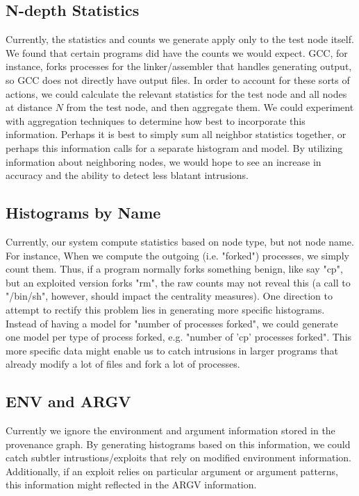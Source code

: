 \documentclass[10pt,twocolumn]{article}
\begin{document}
\subsection{N-depth Statistics}
Currently, the statistics and counts we generate apply only to the test node itself. We found that certain programs did have the counts we would expect. GCC, for instance, forks processes for the linker/assembler that handles generating output, so GCC does not directly have output files. In order to account for these sorts of actions, we could calculate the relevant statistics for the test node and all nodes at distance $N$ from the test node, and then aggregate them. We could experiment with aggregation techniques to determine how best to incorporate this information. Perhaps it is best to simply sum all neighbor statistics together, or perhaps this information calls for a separate histogram and model. By utilizing information about neighboring nodes, we would hope to see an increase in accuracy and the ability to detect less blatant intrusions.
\subsection{Histograms by Name}
Currently, our system compute statistics based on node type, but not node name. For instance, When we compute the outgoing (i.e. "forked") processes, we simply count them. Thus, if a program normally forks something benign, like say "cp", but an exploited version forks "rm", the raw counts may not reveal this (a call to "/bin/sh", however, should impact the centrality measures). One direction to attempt to rectify this problem lies in generating more specific histograms. Instead of having a model for "number of processes forked", we could generate one model per type of process forked, e.g. "number of 'cp' processes forked". This more specific data might enable us to catch intrusions in larger programs that already modify a lot of files and fork a lot of processes.
\subsection{ENV and ARGV}
Currently we ignore the environment and argument information stored in the provenance graph. By generating histograms based on this information, we could catch subtler intrustions/exploits that rely on modified environment information. Additionally, if an exploit relies on particular argument or argument patterns, this information might reflected in the ARGV information.
\end{document}
